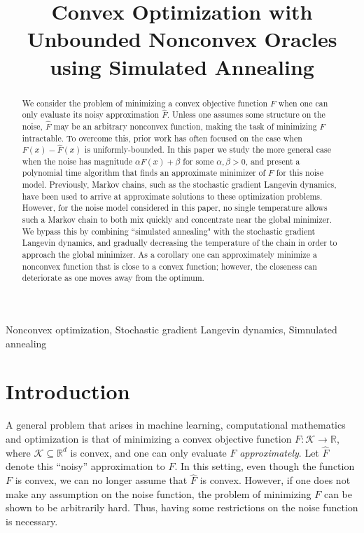 \documentclass[final,12pt]{colt2018} %
\title[Convex Optimization with Unbounded Nonconvex Oracles]{Convex Optimization with Unbounded Nonconvex Oracles using Simulated Annealing}%
\begin{document}
\maketitle
  
 
\begin{abstract}
We consider the problem of minimizing a convex objective function $F$ when one can only evaluate its noisy approximation $\hat{F}$.
%
Unless one assumes some structure on the noise, $\hat{F}$ may be an arbitrary nonconvex function, making the task of minimizing $F$ intractable.
%
To overcome this, prior work has often focused on the case when $F(x)-\hat{F}(x)$ is uniformly-bounded.
%
In this paper we study the more general case when the noise has magnitude $\alpha F(x) + \beta$ for some $\alpha, \beta > 0$, and present a polynomial time algorithm that finds an approximate minimizer of $F$ for this noise model.
%
Previously, Markov chains, such as the stochastic gradient Langevin dynamics, have been used to arrive at approximate solutions to these optimization problems.
%
However, for the noise model considered in this paper, no single temperature allows such a Markov chain to both mix quickly and concentrate near the global minimizer.
%
We bypass this by combining ``simulated annealing" with the stochastic gradient Langevin dynamics, and gradually decreasing the temperature of the chain in order to approach the global minimizer.
%
 As a corollary one can approximately minimize a nonconvex function that is close to a convex function; however, the closeness can deteriorate as one moves away from the optimum.
\end{abstract}

\begin{keywords}
Nonconvex optimization, Stochastic gradient Langevin dynamics, Simnulated annealing
\end{keywords}





\vspace{-4mm}
\section{Introduction}
\vspace{-2mm}
A general problem that arises in machine learning, computational mathematics and optimization is that of minimizing a convex objective function $F:\mathcal{K} \rightarrow \mathbb{R}$, where $\mathcal{K} \subseteq \mathbb{R}^d$ is convex, and one can only evaluate $F$ {\em approximately}.
%
Let $\hat{F}$ denote this ``noisy'' approximation to $F$.
%
In this setting, even though the function $F$ is convex, we can no longer assume that $\hat{F}$ is convex.
% 
However, if one does not make any assumption on the noise function, the problem of minimizing $F$ can be shown to be arbitrarily hard.
%
Thus,  having some restrictions on the noise function is necessary.
  
\end{document}
